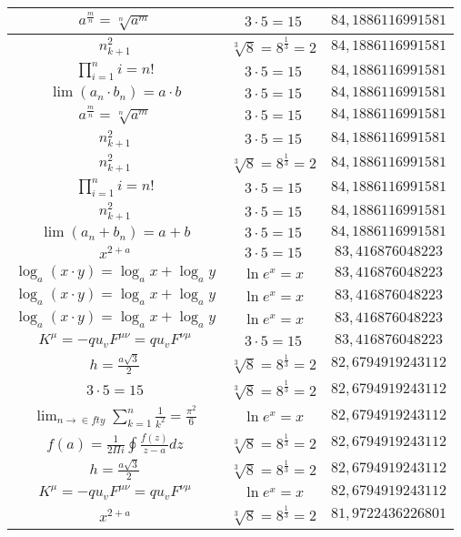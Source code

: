 \documentclass{article}
\begin{document}
\begin{flushleft}
\begin{longtable}{|c|c|c|}
$a^{\frac{m}{n}}=\sqrt[n]{a^{m}}$ & $3\cdot 5=15$ & $84,1886116991581$ \\ \hline 
$n_{k+1}^2$ & $\sqrt[3]{8}=8^{\frac{1}{3}}=2$ & $84,1886116991581$ \\ \hline 
$\prod_{i=1}^ni=n!$ & $3\cdot 5=15$ & $84,1886116991581$ \\ \hline 
$\lim\left(a_n\cdot b_n\right)=a\cdot b$ & $3\cdot 5=15$ & $84,1886116991581$ \\ \hline 
$a^{\frac{m}{n}}=\sqrt[n]{a^{m}}$ & $3\cdot 5=15$ & $84,1886116991581$ \\ \hline 
$n_{k+1}^2$ & $3\cdot 5=15$ & $84,1886116991581$ \\ \hline 
$n_{k+1}^2$ & $\sqrt[3]{8}=8^{\frac{1}{3}}=2$ & $84,1886116991581$ \\ \hline 
$\prod_{i=1}^ni=n!$ & $3\cdot 5=15$ & $84,1886116991581$ \\ \hline 
$n_{k+1}^2$ & $3\cdot 5=15$ & $84,1886116991581$ \\ \hline 
$\lim\left(a_n+b_n\right)=a+b$ & $3\cdot 5=15$ & $84,1886116991581$ \\ \hline 
$x^{2+a}$ & $3\cdot 5=15$ & $83,416876048223$ \\ \hline 
$\log_{a}(x\cdot y)=\log_{a}x+\log_{a}y$ & $\ln e^x=x$ & $83,416876048223$ \\ \hline 
$\log_{a}(x\cdot y)=\log_{a}x+\log_{a}y$ & $\ln e^x=x$ & $83,416876048223$ \\ \hline 
$\log_{a}(x\cdot y)=\log_{a}x+\log_{a}y$ & $\ln e^x=x$ & $83,416876048223$ \\ \hline 
$K^\mu=-qu_vF^{\mu\nu}=qu_vF^{\nu\mu}$ & $3\cdot 5=15$ & $83,416876048223$ \\ \hline 
$h=\frac{a\sqrt{3}}{2}$ & $\sqrt[3]{8}=8^{\frac{1}{3}}=2$ & $82,6794919243112$ \\ \hline 
$3\cdot 5=15$ & $\sqrt[3]{8}=8^{\frac{1}{3}}=2$ & $82,6794919243112$ \\ \hline 
$\lim_{n\to\in fty}\sum_{k=1}^n\frac{1}{k^2}=\frac{\pi^2}{6}$ & $\ln e^x=x$ & $82,6794919243112$ \\ \hline 
$f\left(a\right)=\frac{1}{2\Pi i}\oint\frac{f\left(z\right)}{z-a}dz$ & $\sqrt[3]{8}=8^{\frac{1}{3}}=2$ & $82,6794919243112$ \\ \hline 
$h=\frac{a\sqrt{3}}{2}$ & $\sqrt[3]{8}=8^{\frac{1}{3}}=2$ & $82,6794919243112$ \\ \hline 
$K^\mu=-qu_vF^{\mu\nu}=qu_vF^{\nu\mu}$ & $\ln e^x=x$ & $82,6794919243112$ \\ \hline 
$x^{2+a}$ & $\sqrt[3]{8}=8^{\frac{1}{3}}=2$ & $81,9722436226801$ \\ \hline 

\end{longtable}
\end{flushleft}
\end{document}
